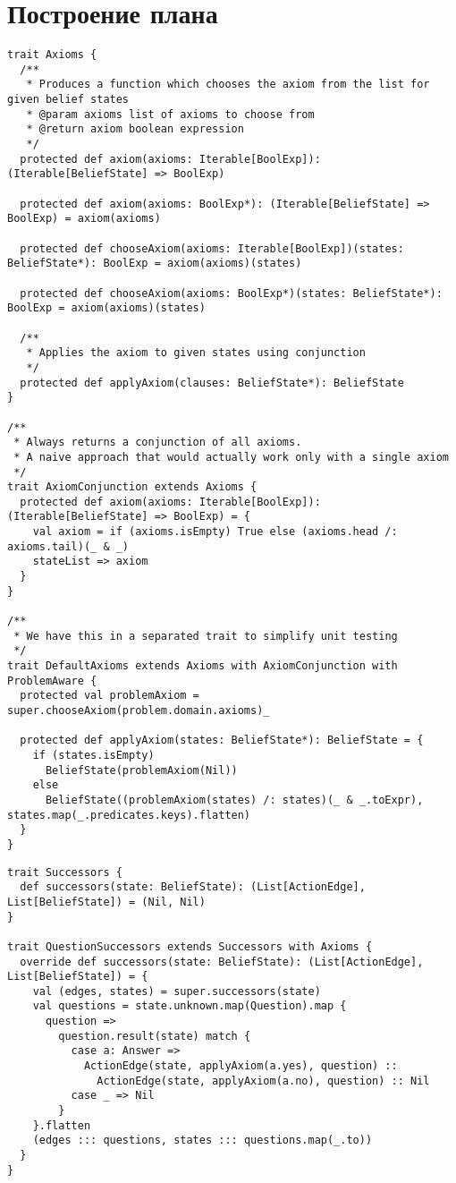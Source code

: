 \section*{Построение плана}

\begin{lstlisting}[caption=Axioms, label=source_axioms]
 trait Axioms {
  /**
   * Produces a function which chooses the axiom from the list for given belief states
   * @param axioms list of axioms to choose from
   * @return axiom boolean expression
   */
  protected def axiom(axioms: Iterable[BoolExp]): (Iterable[BeliefState] => BoolExp)

  protected def axiom(axioms: BoolExp*): (Iterable[BeliefState] => BoolExp) = axiom(axioms)

  protected def chooseAxiom(axioms: Iterable[BoolExp])(states: BeliefState*): BoolExp = axiom(axioms)(states)

  protected def chooseAxiom(axioms: BoolExp*)(states: BeliefState*): BoolExp = axiom(axioms)(states)

  /**
   * Applies the axiom to given states using conjunction
   */
  protected def applyAxiom(clauses: BeliefState*): BeliefState
}

/**
 * Always returns a conjunction of all axioms.
 * A naive approach that would actually work only with a single axiom
 */
trait AxiomConjunction extends Axioms {
  protected def axiom(axioms: Iterable[BoolExp]): (Iterable[BeliefState] => BoolExp) = {
    val axiom = if (axioms.isEmpty) True else (axioms.head /: axioms.tail)(_ & _)
    stateList => axiom
  }
}

/**
 * We have this in a separated trait to simplify unit testing
 */
trait DefaultAxioms extends Axioms with AxiomConjunction with ProblemAware {
  protected val problemAxiom = super.chooseAxiom(problem.domain.axioms)_

  protected def applyAxiom(states: BeliefState*): BeliefState = {
    if (states.isEmpty)
      BeliefState(problemAxiom(Nil))
    else
      BeliefState((problemAxiom(states) /: states)(_ & _.toExpr), states.map(_.predicates.keys).flatten)
  }
}
\end{lstlisting}


\begin{lstlisting}[caption=Successors, label=source_sc]
 trait Successors {
  def successors(state: BeliefState): (List[ActionEdge], List[BeliefState]) = (Nil, Nil)
}

trait QuestionSuccessors extends Successors with Axioms {
  override def successors(state: BeliefState): (List[ActionEdge], List[BeliefState]) = {
    val (edges, states) = super.successors(state)
    val questions = state.unknown.map(Question).map {
      question =>
        question.result(state) match {
          case a: Answer =>
            ActionEdge(state, applyAxiom(a.yes), question) ::
              ActionEdge(state, applyAxiom(a.no), question) :: Nil
          case _ => Nil
        }
    }.flatten
    (edges ::: questions, states ::: questions.map(_.to))
  }
}
\end{lstlisting}

